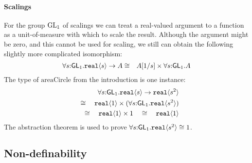 \begin{example}
\paragraph{Scalings}
For the group $\mathrm{GL}_1$ of scalings we can treat
a real-valued argument to a function as a unit-of-measure with
which to scale the result. 
Although the argument might be zero, and this cannot be used for scaling,
we still can obtain the following slightly more complicated
isomorphism:
\begin{eqnarray*}
\forall s\mathord:\mathsf{GL}_1.\textup{\texttt{real}}\langle s \rangle\to A
& \cong &
A[1/s]\times \forall s\mathord:\mathsf{GL}_1.A
\end{eqnarray*}
The type of $\mathrm{areaCircle}$ from the introduction is one instance:
\begin{eqnarray*}
\forall s\mathord:\mathsf{GL}_1.\textup{\texttt{real}}\langle s \rangle\to\textup{\texttt{real}}\langle s^2 \rangle\\ \quad\cong\quad \textup{\texttt{real}}\langle 1 \rangle\times(\forall
s\mathord:\mathsf{GL}_1.\textup{\texttt{real}}\langle s^2 \rangle)\\ \quad\cong\quad
\textup{\texttt{real}}\langle 1 \rangle\times 1\quad\cong\quad \textup{\texttt{real}}\langle 1 \rangle
\end{eqnarray*}
The abstraction theorem is used to prove
$\forall s\mathord:\mathsf{GL}_1.\textup{\texttt{real}}\langle s^2 \rangle\cong 1$.
\end{example}

\subsection{Non-definability}
\label{sec:types-indexed-abelian-groups-indef}

